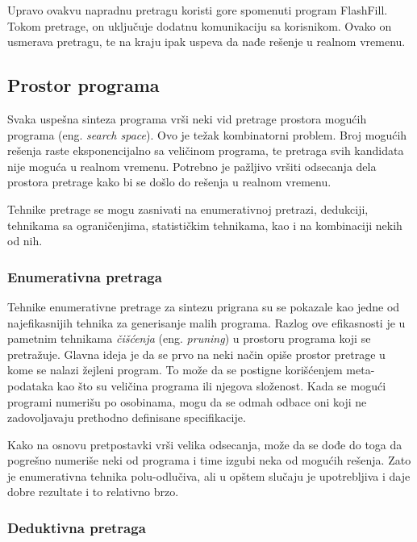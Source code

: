 Upravo ovakvu napradnu pretragu koristi gore spomenuti program FlashFill. Tokom pretrage, on uključuje dodatnu komunikaciju sa korisnikom. Ovako on usmerava pretragu, te na kraju ipak uspeva da nađe rešenje u realnom vremenu.


\subsection{Prostor programa}
\label{subsec:ProstorPrograma}

Svaka uspešna sinteza programa vrši neki vid pretrage prostora mogućih programa (eng. \emph{search space}). Ovo je težak kombinatorni problem. Broj mogućih rešenja raste eksponencijalno sa veličinom programa, te pretraga svih kandidata nije moguća u realnom vremenu. Potrebno je pažljivo vršiti odsecanja dela prostora pretrage kako bi se došlo do rešenja u realnom vremenu.

Tehnike pretrage se mogu zasnivati na enumerativnoj pretrazi, dedukciji, tehnikama sa ograničenjima, statističkim tehnikama, kao i na kombinaciji nekih od nih.


\subsubsection{Enumerativna pretraga}
\label{subsubsec:Enumerative}

Tehnike enumerativne pretrage za sintezu prigrana su se pokazale kao jedne od najefikasnijih tehnika za generisanje malih programa. Razlog ove efikasnosti je u pametnim tehnikama \emph{čišćenja} (eng. \emph{pruning}) u prostoru programa koji se pretražuje. Glavna ideja je da se prvo na neki način opiše prostor pretrage u kome se nalazi žejleni program. To može da se postigne korišćenjem meta-podataka kao što su veličina programa ili njegova složenost. Kada se mogući programi numerišu po osobinama, mogu da se odmah odbace oni koji ne zadovoljavaju prethodno definisane specifikacije.

Kako na osnovu pretpostavki vrši velika odsecanja, može da se dođe do toga da pogrešno numeriše neki od programa i time izgubi neka od mogućih rešenja. Zato je enumerativna tehnika polu-odlučiva, ali u opštem slučaju je upotrebljiva i daje dobre rezultate i to relativno brzo.


\subsubsection{Deduktivna pretraga}
\label{subsubsec:Deductive}

